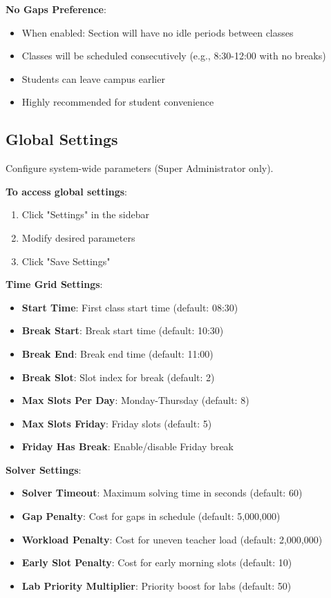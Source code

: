 \documentclass[12pt,a4paper]{article}
\begin{document}
\textbf{No Gaps Preference}:
\begin{itemize}
\item When enabled: Section will have no idle periods between classes
\item Classes will be scheduled consecutively (e.g., 8:30-12:00 with no breaks)
\item Students can leave campus earlier
\item Highly recommended for student convenience
\end{itemize}

\subsection{Global Settings}

Configure system-wide parameters (Super Administrator only).

\textbf{To access global settings}:
\begin{enumerate}
\item Click "Settings" in the sidebar
\item Modify desired parameters
\item Click "Save Settings"
\end{enumerate}

\textbf{Time Grid Settings}:
\begin{itemize}
\item \textbf{Start Time}: First class start time (default: 08:30)
\item \textbf{Break Start}: Break start time (default: 10:30)
\item \textbf{Break End}: Break end time (default: 11:00)
\item \textbf{Break Slot}: Slot index for break (default: 2)
\item \textbf{Max Slots Per Day}: Monday-Thursday (default: 8)
\item \textbf{Max Slots Friday}: Friday slots (default: 5)
\item \textbf{Friday Has Break}: Enable/disable Friday break
\end{itemize}

\textbf{Solver Settings}:
\begin{itemize}
\item \textbf{Solver Timeout}: Maximum solving time in seconds (default: 60)
\item \textbf{Gap Penalty}: Cost for gaps in schedule (default: 5,000,000)
\item \textbf{Workload Penalty}: Cost for uneven teacher load (default: 2,000,000)
\item \textbf{Early Slot Penalty}: Cost for early morning slots (default: 10)
\item \textbf{Lab Priority Multiplier}: Priority boost for labs (default: 50)
\end{itemize}
\end{document}
